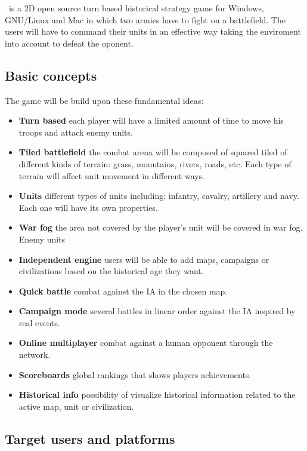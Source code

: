 
\game\ is a 2D open source turn based historical strategy game for
Windows, GNU/Linux and Mac in which two armies have to fight on a
battlefield. The users will have to command their units in an effective
way taking the enviroment into account to defeat the oponent.\\

\subsection{Basic concepts}

The game will be build upon these fundamental ideas:

\begin{itemize}
    \item \textbf{Turn based} each player will have a limited amount of time to
    move his troops and attack enemy units.
    \item \textbf{Tiled battlefield} the combat arena will be composed of squared
    tiled of different kinds of terrain: grass, mountains, rivers, roads,
    etc. Each type of terrain will affect unit movement in different ways.
    \item \textbf{Units} different types of units including: infantry, cavalry,
    artillery and navy. Each one will have its own properties.
    \item \textbf{War fog} the area not covered by the player's unit will be covered
    in war fog. Enemy units 
    \item \textbf{Independent engine} users will be able to add maps, campaigns
    or civilizations based on the historical age they want.
    \item \textbf{Quick battle} combat against the IA in the chosen map.
    \item \textbf{Campaign mode} several battles in linear order against the IA
    inspired by real events.
    \item \textbf{Online multiplayer} combat against a human opponent through the
    network.
    \item \textbf{Scoreboards} global rankings that shows players achievements.
    \item \textbf{Historical info} possibility of visualize historical information
    related to the active map, unit or civilization.
\end{itemize}

\subsection{Target users and platforms}

